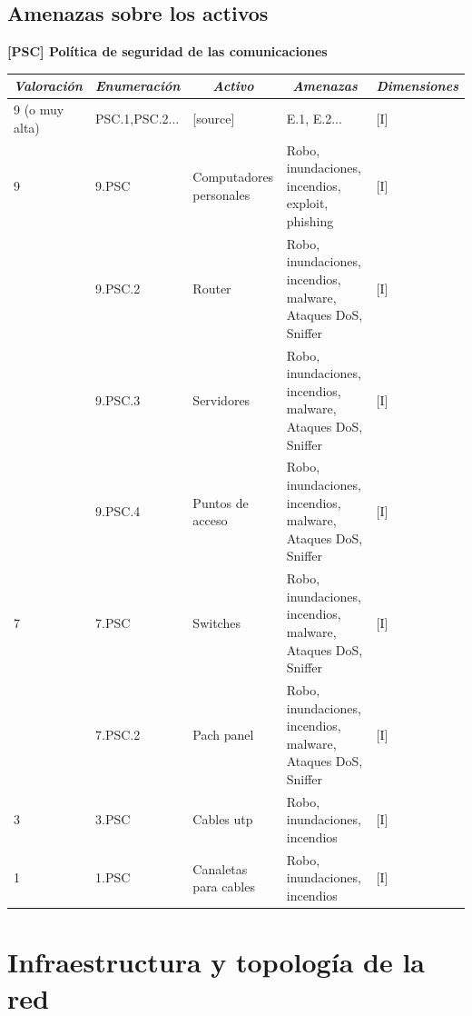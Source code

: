 \documentclass[11pt,bibtotoc,noliststotoc,BCOR0mm]{scrbook}
\newcommand{\cellcenter}[1]{\multicolumn{1}{c}{#1}}
\newcommand{\thead}[1]{\textbf{\emph{#1}}}
\begin{document}
\subsection{Amenazas sobre los activos}
\textbf{[PSC] Política de seguridad de las comunicaciones}
\begin{center}
  \centering
  \begin{tabular}{|m{}|m{}|m{}|m{}|m{}|}
    \cellcenter{\thead{Valoración}} & \cellcenter{\thead{Enumeración}} & \cellcenter{\thead{Activo}} & \cellcenter{\thead{Amenazas}} 
& \cellcenter{\thead{Dimensiones}} \\ \hline
    9 (o muy alta) & PSC.1,PSC.2... & [source] & E.1, E.2... & [I] \\ \hline
    9 & 9.PSC & Computadores personales & Robo, inundaciones, incendios, exploit, phishing  & [I] \\ \hline
    & 9.PSC.2 & Router & Robo, inundaciones, incendios, malware, Ataques DoS, Sniffer & [I] \\ \hline
    & 9.PSC.3 & Servidores & Robo, inundaciones, incendios, malware, Ataques DoS, Sniffer & [I] \\ \hline
    & 9.PSC.4 & Puntos de acceso & Robo, inundaciones, incendios, malware, Ataques DoS, Sniffer & [I] \\ \hline
    7 & 7.PSC & Switches & Robo, inundaciones, incendios, malware, Ataques DoS, Sniffer & [I] \\ \hline
    
    & 7.PSC.2 & Pach panel & Robo, inundaciones, incendios, malware, Ataques DoS, Sniffer & [I] \\ \hline
    
    3 & 3.PSC & Cables utp & Robo, inundaciones, incendios & [I] \\ \hline
    1 & 1.PSC & Canaletas para cables & Robo, inundaciones, incendios & [I] \\ \hline
  \end{tabular}
\end{center}

\section{Infraestructura y topología de la red}
\end{document}
